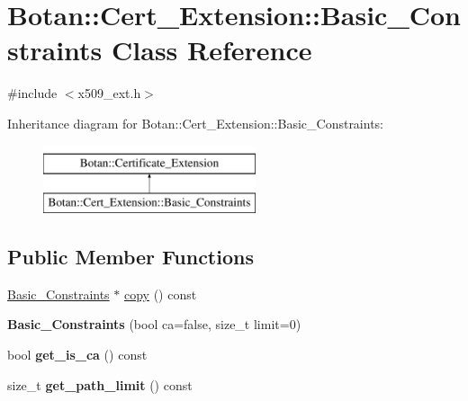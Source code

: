 \hypertarget{classBotan_1_1Cert__Extension_1_1Basic__Constraints}{\section{Botan\-:\-:Cert\-\_\-\-Extension\-:\-:Basic\-\_\-\-Constraints Class Reference}
\label{classBotan_1_1Cert__Extension_1_1Basic__Constraints}
}


{\ttfamily \#include $<$x509\-\_\-ext.\-h$>$}

Inheritance diagram for Botan\-:\-:Cert\-\_\-\-Extension\-:\-:Basic\-\_\-\-Constraints\-:\begin{figure}[H]
\begin{center}
\leavevmode
\includegraphics[height=2.000000cm]{classBotan_1_1Cert__Extension_1_1Basic__Constraints}
\end{center}
\end{figure}
\subsection*{Public Member Functions}
\begin{DoxyCompactItemize}
\item 
\hyperlink{classBotan_1_1Cert__Extension_1_1Basic__Constraints}{Basic\-\_\-\-Constraints} $\ast$ \hyperlink{classBotan_1_1Cert__Extension_1_1Basic__Constraints_ac0cbaa914b9d7abd21975ae759ba6f28}{copy} () const 
\item 
\hypertarget{classBotan_1_1Cert__Extension_1_1Basic__Constraints_a92b0742b7442e9ed38fa752f75bbcec0}{{\bfseries Basic\-\_\-\-Constraints} (bool ca=false, size\-\_\-t limit=0)}\label{classBotan_1_1Cert__Extension_1_1Basic__Constraints_a92b0742b7442e9ed38fa752f75bbcec0}

\item 
\hypertarget{classBotan_1_1Cert__Extension_1_1Basic__Constraints_a825e53f86221509dc754537c2e561fc2}{bool {\bfseries get\-\_\-is\-\_\-ca} () const }\label{classBotan_1_1Cert__Extension_1_1Basic__Constraints_a825e53f86221509dc754537c2e561fc2}

\item 
\hypertarget{classBotan_1_1Cert__Extension_1_1Basic__Constraints_a41ffba248ec70c1a5dfea9fff75e686b}{size\-\_\-t {\bfseries get\-\_\-path\-\_\-limit} () const }\label{classBotan_1_1Cert__Extension_1_1Basic__Constraints_a41ffba248ec70c1a5dfea9fff75e686b}

\end{DoxyCompactItemize}
